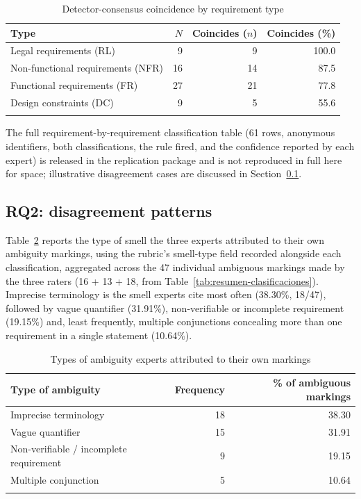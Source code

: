 \documentclass[pdflatex,sn-mathphys-num]{sn-jnl}
\theoremstyle{thmstyleone}%
\theoremstyle{thmstyletwo}%
\theoremstyle{thmstylethree}%
\begin{document}
	\begin{table}[h]
		\caption{Detector-consensus coincidence by requirement type}\label{tab:coincidencia-tipo}
		\begin{tabular}{@{}lrrr@{}}
			\toprule
			Type & $N$ & Coincides ($n$) & Coincides (\%) \\
			\midrule
			Legal requirements (RL) & 9 & 9 & 100.0 \\
			Non-functional requirements (NFR) & 16 & 14 & 87.5 \\
			Functional requirements (FR) & 27 & 21 & 77.8 \\
			Design constraints (DC) & 9 & 5 & 55.6 \\
			\botrule
		\end{tabular}
	\end{table}
	
	The full requirement-by-requirement classification table (61 rows, anonymous
	identifiers, both classifications, the rule fired, and the confidence reported
	by each expert) is released in the replication package and is not reproduced in
	full here for space; illustrative disagreement cases are discussed in
	Section~\ref{subsec:res-rq2}.
	
	\subsection{RQ2: disagreement patterns}\label{subsec:res-rq2}
	
	Table~\ref{tab:tipos-ambiguedad} reports the type of smell the three experts
	attributed to their own ambiguity markings, using the rubric's smell-type field
	recorded alongside each classification, aggregated across the 47 individual
	ambiguous markings made by the three raters (16 + 13 + 18, from
	Table~\ref{tab:resumen-clasificaciones}). Imprecise terminology is the smell
	experts cite most often (38.30\%, 18/47), followed by vague quantifier
	(31.91\%), non-verifiable or incomplete requirement (19.15\%) and, least
	frequently, multiple conjunctions concealing more than one requirement in a
	single statement (10.64\%).
	
	\begin{table}[h]
		\caption{Types of ambiguity experts attributed to their own markings}\label{tab:tipos-ambiguedad}
		\begin{tabular}{@{}lrr@{}}
			\toprule
			Type of ambiguity & Frequency & \% of ambiguous markings \\
			\midrule
			Imprecise terminology & 18 & 38.30 \\
			Vague quantifier & 15 & 31.91 \\
			Non-verifiable / incomplete requirement & 9 & 19.15 \\
			Multiple conjunction & 5 & 10.64 \\
			\botrule
		\end{tabular}
	\end{table}
	
\end{document}

